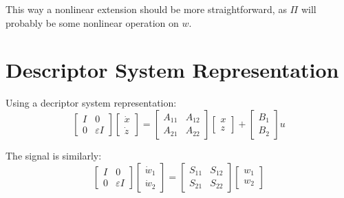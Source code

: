 \documentclass{article}
\begin{document}
This way a nonlinear extension should be more straightforward, as $\Pi$ will probably be some nonlinear operation on $w$.

\section{Descriptor System Representation}
Using a decriptor system representation: 
\begin{equation}
\begin{bmatrix}
I & 0 \\
0 & \varepsilon I 
\end{bmatrix}
\begin{bmatrix}
  \dot{x} \\
  \dot{z}
\end{bmatrix}
= 
\begin{bmatrix}
A_{11} & A_{12} \\
A_{21} & A_{22}
\end{bmatrix}
\begin{bmatrix}
  x \\  
  z
\end{bmatrix}
+
\begin{bmatrix}
B_1 \\
B_2
\end{bmatrix} u
\end{equation}

The signal is similarly: 
\begin{equation}
\begin{bmatrix}
I & 0 \\
0 & \varepsilon I
\end{bmatrix}
\begin{bmatrix}
  \dot{w}_1 \\
  \dot{w}_2
\end{bmatrix}
=
\begin{bmatrix}
S_{11} & S_{12} \\
S_{21} & S_{22}
\end{bmatrix}
\begin{bmatrix}
  w_1 \\  
  w_2
\end{bmatrix}
\end{equation}
\end{document}
